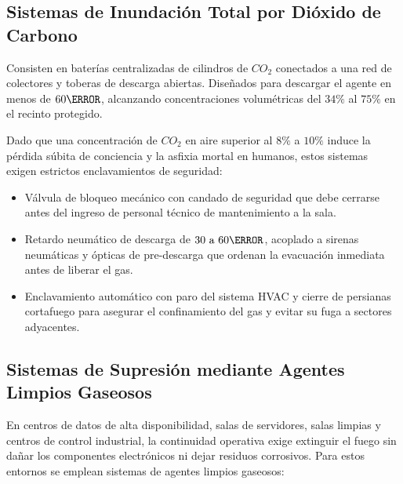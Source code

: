 \subsection{Sistemas de Inundación Total por Dióxido de Carbono}

Consisten en baterías centralizadas de cilindros de $CO_2$ conectados a una red de colectores y toberas de descarga
abiertas. Diseñados para descargar el agente en menos de $60\s$, alcanzando concentraciones volumétricas del $34\percent$ al
$75\percent$ en el recinto protegido.

Dado que una concentración de $CO_2$ en aire superior al $8\percent$ a $10\percent$ induce la pérdida súbita de conciencia y la
asfixia mortal en humanos, estos sistemas exigen estrictos enclavamientos de seguridad:
\begin{itemize}
    \item Válvula de bloqueo mecánico con candado de seguridad que debe cerrarse antes del ingreso
          de personal técnico de mantenimiento a la sala.
    \item Retardo neumático de descarga de $30\text{ a }60\s$, acoplado a sirenas neumáticas y ópticas de pre-descarga que
          ordenan la evacuación inmediata antes de liberar el gas.
    \item Enclavamiento automático con paro del sistema HVAC y cierre de persianas cortafuego para asegurar el confinamiento
          del gas y evitar su fuga a sectores adyacentes.
\end{itemize}

\subsection{Sistemas de Supresión mediante Agentes Limpios Gaseosos}

En centros de datos de alta disponibilidad, salas de servidores, salas limpias y centros de control industrial, la
continuidad operativa exige extinguir el fuego sin dañar los componentes electrónicos ni dejar residuos corrosivos. Para
estos entornos se emplean sistemas de agentes limpios gaseosos:

